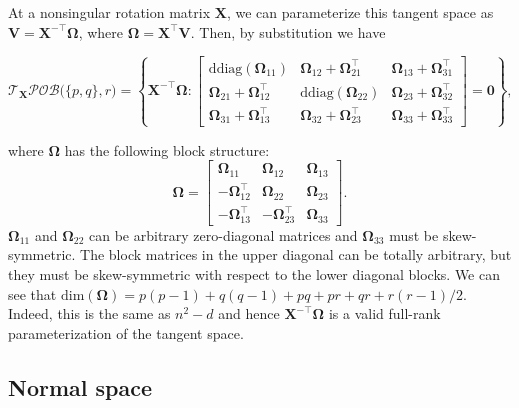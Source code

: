 \documentclass[
  12pt,
  letterpaper,
  article]{scrartcl}
\begin{document}
At a nonsingular rotation matrix \(\mathbf{X}\), we can parameterize
this tangent space as \(\mathbf{V}=\mathbf{X}^{-\top}\mathbf{\Omega}\),
where \(\mathbf{\Omega}=\mathbf{X}^\top\mathbf{V}\). Then, by
substitution we have

\[
\mathcal{T}_{\mathbf{X}}
\mathcal{POB}\big(\{p,q\},r\big)
= \left\{ 
\mathbf{X}^{-\top}\mathbf{\Omega}: \begin{bmatrix}
\text{ddiag}(\mathbf{\Omega}_{11})
&
\mathbf{\Omega}_{12} + \mathbf{\Omega}_{21}^\top
&
\mathbf{\Omega}_{13} + \mathbf{\Omega}_{31}^\top
\\
\mathbf{\Omega}_{21} + \mathbf{\Omega}_{12}^\top
&
\text{ddiag}(\mathbf{\Omega}_{22})
&
\mathbf{\Omega}_{23} + \mathbf{\Omega}_{32}^\top
\\
\mathbf{\Omega}_{31} + \mathbf{\Omega}_{13}^\top
&
\mathbf{\Omega}_{32} + \mathbf{\Omega}_{23}^\top
&
\mathbf{\Omega}_{33} + \mathbf{\Omega}_{33}^\top
\end{bmatrix} = \mathbf{0}
\right\},
\]

where \(\mathbf{\Omega}\) has the following block structure: \[
\mathbf{\Omega} = \begin{bmatrix}
\mathbf{\Omega}_{11}
&
\mathbf{\Omega}_{12}
&
\mathbf{\Omega}_{13}
\\
-\mathbf{\Omega}_{12}^\top
&
\mathbf{\Omega}_{22}
&
\mathbf{\Omega}_{23} 
\\
-\mathbf{\Omega}_{13}^\top
&
-\mathbf{\Omega}_{23}^\top
&
\mathbf{\Omega}_{33}
\end{bmatrix}.
\] \(\mathbf{\Omega}_{11}\) and \(\mathbf{\Omega}_{22}\) can be
arbitrary zero-diagonal matrices and \(\mathbf{\Omega}_{33}\) must be
skew-symmetric. The block matrices in the upper diagonal can be totally
arbitrary, but they must be skew-symmetric with respect to the lower
diagonal blocks. We can see that
\(\text{dim}(\mathbf{\Omega}) = p(p-1) + q(q-1) + pq + pr + qr + r(r-1)/2\).
Indeed, this is the same as \(n^2-d\) and hence
\(\mathbf{X}^{-\top}\mathbf{\Omega}\) is a valid full-rank
parameterization of the tangent space.

\subsection{Normal space}\label{normal-space}
\end{document}

